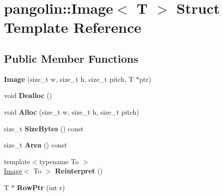 \hypertarget{structpangolin_1_1_image}{}\section{pangolin\+:\+:Image$<$ T $>$ Struct Template Reference}
\label{structpangolin_1_1_image}
\subsection*{Public Member Functions}
\begin{DoxyCompactItemize}
\item 
{\bfseries Image} (size\+\_\+t w, size\+\_\+t h, size\+\_\+t pitch, T $\ast$ptr)\hypertarget{structpangolin_1_1_image_a843e5cd20521c73cc30a230366512698}{}\label{structpangolin_1_1_image_a843e5cd20521c73cc30a230366512698}

\item 
void {\bfseries Dealloc} ()\hypertarget{structpangolin_1_1_image_a5662d09907544fbb0be7c8aa49e7d7c9}{}\label{structpangolin_1_1_image_a5662d09907544fbb0be7c8aa49e7d7c9}

\item 
void {\bfseries Alloc} (size\+\_\+t w, size\+\_\+t h, size\+\_\+t pitch)\hypertarget{structpangolin_1_1_image_ae06802509f71b4dbdccd89bafac0ee1f}{}\label{structpangolin_1_1_image_ae06802509f71b4dbdccd89bafac0ee1f}

\item 
size\+\_\+t {\bfseries Size\+Bytes} () const \hypertarget{structpangolin_1_1_image_a948128dcb7266100a554f8e639622a1f}{}\label{structpangolin_1_1_image_a948128dcb7266100a554f8e639622a1f}

\item 
size\+\_\+t {\bfseries Area} () const \hypertarget{structpangolin_1_1_image_adbafe72c3158823546b4270336e5a4da}{}\label{structpangolin_1_1_image_adbafe72c3158823546b4270336e5a4da}

\item 
{\footnotesize template$<$typename To $>$ }\\\hyperlink{structpangolin_1_1_image}{Image}$<$ To $>$ {\bfseries Reinterpret} ()\hypertarget{structpangolin_1_1_image_a05f948d07fe2d1e7a4541404f8cdd874}{}\label{structpangolin_1_1_image_a05f948d07fe2d1e7a4541404f8cdd874}

\item 
T $\ast$ {\bfseries Row\+Ptr} (int r)\hypertarget{structpangolin_1_1_image_a2584b77d0c0e51d348493b1186b6d576}{}\label{structpangolin_1_1_image_a2584b77d0c0e51d348493b1186b6d576}

\end{DoxyCompactItemize}
